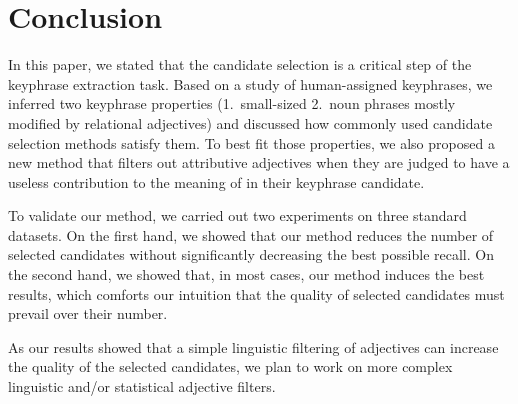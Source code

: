 \section{Conclusion}
\label{sec:conclusion}
  In this paper, we stated that the candidate selection is a critical step of
  the keyphrase extraction task. Based on a study of human-assigned keyphrases,
  we inferred two keyphrase properties (1.~small-sized 2.~noun phrases mostly
  modified by relational adjectives) and
  discussed how commonly used candidate selection methods satisfy them. To best
  fit those properties, we also proposed a new method that filters out
  attributive adjectives when they are judged to have a useless contribution to
  the meaning of in their keyphrase candidate.

  To validate our method, we carried out two experiments on three standard
  datasets. On the first hand, we showed that our method reduces the number of
  selected candidates without significantly decreasing the best possible recall.
  On the second hand, we showed that, in most cases, our method induces the best
  results, which comforts our intuition that the quality of selected candidates
  must prevail over their number.

  As our results showed that a simple linguistic filtering of adjectives can
  increase the quality of the selected candidates, we plan to work on more
  complex linguistic and/or statistical adjective filters.

